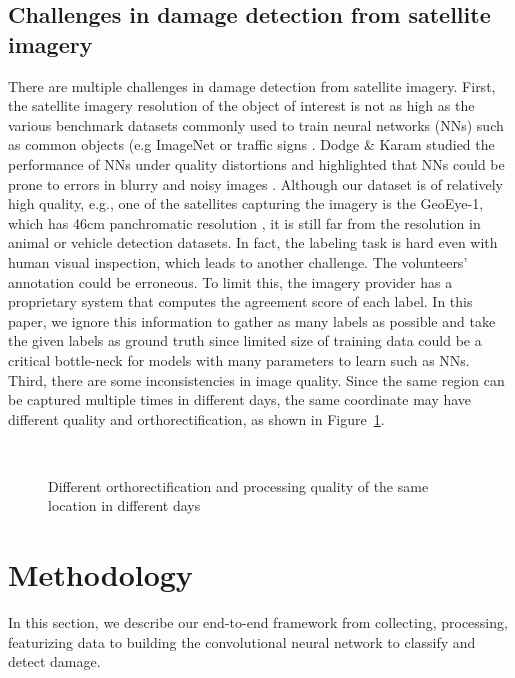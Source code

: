 \documentclass[journal, 12pt, onecolumn,draftclsnofoot]{IEEEtran}
\begin{document}
\subsection{Challenges in damage detection from satellite imagery}
There are multiple challenges in damage detection from satellite imagery. First, the satellite imagery resolution of the object of interest is not as high as the various benchmark datasets commonly used to train neural networks (NNs) such as common objects (e.g ImageNet \cite{cnn-imagenet} or traffic signs \cite{trafficSign}. Dodge \& Karam studied the performance of NNs under quality distortions and highlighted that NNs could be prone to errors in blurry and noisy images \cite{Dodge2016}. Although our dataset is of relatively high quality, e.g., one of the satellites capturing the imagery is the GeoEye-1, which has 46cm panchromatic resolution \cite{geoeye}, it is still far from the resolution in animal or vehicle detection datasets. In fact, the labeling task is hard even with human visual inspection, which leads to another challenge. The volunteers' annotation could be erroneous. To limit this, the imagery provider has a proprietary system that computes the agreement score of each label. In this paper, we ignore this information to gather as many labels as possible and take the given labels as ground truth since limited size of training data could be a critical bottle-neck for models with many parameters to learn such as NNs. Third, there are some inconsistencies in image quality. Since the same region can be captured multiple times in different days, the same coordinate may have different quality and orthorectification, as shown in Figure~\ref{fig:orthorectification}. 

\begin{figure}[h]{\centering
{}
\\
\caption{\small{Different orthorectification and processing quality  of the same location in different days}}
\label{fig:orthorectification}
}
\end{figure}
\section{Methodology}\label{sec:method}
In this section, we describe our end-to-end framework from collecting, processing, featurizing data to building the convolutional neural network to classify and detect damage. 
\end{document}
